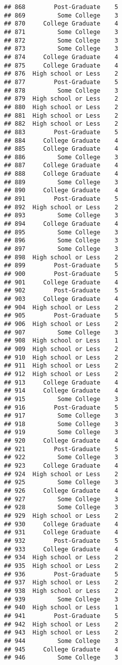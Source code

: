\documentclass[
]{article}
\begin{document}
\begin{verbatim}
## 868        Post-Graduate    5
## 869         Some College    3
## 870     College Graduate    4
## 871         Some College    3
## 872         Some College    3
## 873         Some College    3
## 874     College Graduate    4
## 875     College Graduate    4
## 876  High school or Less    2
## 877        Post-Graduate    5
## 878         Some College    3
## 879  High school or Less    2
## 880  High school or Less    2
## 881  High school or Less    2
## 882  High school or Less    2
## 883        Post-Graduate    5
## 884     College Graduate    4
## 885     College Graduate    4
## 886         Some College    3
## 887     College Graduate    4
## 888     College Graduate    4
## 889         Some College    3
## 890     College Graduate    4
## 891        Post-Graduate    5
## 892  High school or Less    2
## 893         Some College    3
## 894     College Graduate    4
## 895         Some College    3
## 896         Some College    3
## 897         Some College    3
## 898  High school or Less    2
## 899        Post-Graduate    5
## 900        Post-Graduate    5
## 901     College Graduate    4
## 902        Post-Graduate    5
## 903     College Graduate    4
## 904  High school or Less    2
## 905        Post-Graduate    5
## 906  High school or Less    2
## 907         Some College    3
## 908  High school or Less    1
## 909  High school or Less    2
## 910  High school or Less    2
## 911  High school or Less    2
## 912  High school or Less    2
## 913     College Graduate    4
## 914     College Graduate    4
## 915         Some College    3
## 916        Post-Graduate    5
## 917         Some College    3
## 918         Some College    3
## 919         Some College    3
## 920     College Graduate    4
## 921        Post-Graduate    5
## 922         Some College    3
## 923     College Graduate    4
## 924  High school or Less    2
## 925         Some College    3
## 926     College Graduate    4
## 927         Some College    3
## 928         Some College    3
## 929  High school or Less    2
## 930     College Graduate    4
## 931     College Graduate    4
## 932        Post-Graduate    5
## 933     College Graduate    4
## 934  High school or Less    2
## 935  High school or Less    2
## 936        Post-Graduate    5
## 937  High school or Less    2
## 938  High school or Less    2
## 939         Some College    3
## 940  High school or Less    1
## 941        Post-Graduate    5
## 942  High school or Less    2
## 943  High school or Less    2
## 944         Some College    3
## 945     College Graduate    4
## 946         Some College    3

\end{verbatim}
\end{document}

